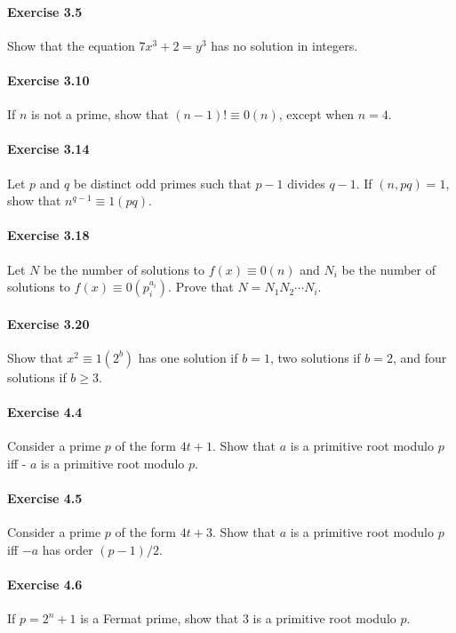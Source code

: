 \documentclass{article}
\begin{document}
\paragraph{Exercise 3.5} Show that the equation $7 x^{3}+2=y^{3}$ has no solution in integers.

\paragraph{Exercise 3.10} If $n$ is not a prime, show that $(n-1) ! \equiv 0(n)$, except when $n=4$.

\paragraph{Exercise 3.14} Let $p$ and $q$ be distinct odd primes such that $p-1$ divides $q-1$. If $(n, p q)=1$, show that $n^{q-1} \equiv 1(p q)$.

\paragraph{Exercise 3.18} Let $N$ be the number of solutions to $f(x) \equiv 0(n)$ and $N_{i}$ be the number of solutions to $f(x) \equiv 0\left(p_{i}^{a_{i}}\right)$. Prove that $N=N_{1} N_{2} \cdots N_{i}$.

\paragraph{Exercise 3.20} Show that $x^{2} \equiv 1\left(2^{b}\right)$ has one solution if $b=1$, two solutions if $b=2$, and four solutions if $b \geq 3$.

\paragraph{Exercise 4.4} Consider a prime $p$ of the form $4 t+1$. Show that $a$ is a primitive root modulo $p$ iff - $a$ is a primitive root modulo $p$.

\paragraph{Exercise 4.5} Consider a prime $p$ of the form $4 t+3$. Show that $a$ is a primitive root modulo $p$ iff $-a$ has order $(p-1) / 2$.

\paragraph{Exercise 4.6} If $p=2^{n}+1$ is a Fermat prime, show that 3 is a primitive root modulo $p$.
\end{document}
